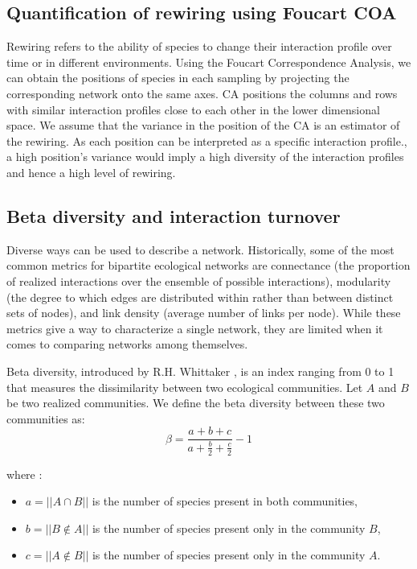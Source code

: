 \subsection{Quantification of rewiring using Foucart COA}

Rewiring refers to the ability of species to change their interaction profile over time or in different environments. Using the Foucart Correspondence Analysis, we can obtain the positions of species in each sampling by projecting the corresponding network onto the same axes. CA positions the columns and rows with similar interaction profiles close to each other in the lower dimensional space.
We assume that the variance in the position of the CA is an estimator of the rewiring. As each position can be interpreted as a specific interaction profile., a high position's variance would imply a high diversity of the interaction profiles and hence a high level of rewiring.

\subsection{Beta diversity and interaction turnover}

Diverse ways can be used to describe a network. Historically, some of the most common metrics for bipartite ecological networks are connectance (the proportion of realized interactions over the ensemble of possible interactions), modularity (the degree to which edges are distributed within rather than between distinct sets of nodes), and link density (average number of links per node). While these metrics give a way to characterize a single network, they are limited when it comes to comparing networks among themselves.

Beta diversity, introduced by R.H. Whittaker \citep{whittaker_1960}, is an index ranging from 0 to 1 that measures the dissimilarity between two ecological communities. Let $A$ and $B$ be two realized communities. We define the beta diversity between these two communities as: 
$$
    \beta = \frac{a+b+c}{a+\frac{b}{2} + \frac{c}{2}} - 1
$$

where :
\begin{itemize}
    \item $a = ||A \cap B||$ is the number of species present in both communities,
    \item $b = ||B \notin A||$ is the number of species present only in the community $B$,
    \item $c = ||A \notin B||$ is the number of species present only in the community $A$.
\end{itemize}

